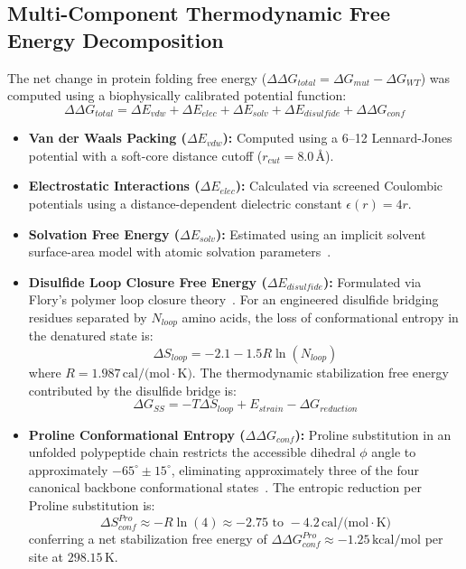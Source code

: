 \documentclass[10pt,twocolumn,a4paper]{article}
\begin{document}
\subsection{Multi-Component Thermodynamic Free Energy Decomposition}
The net change in protein folding free energy ($\Delta\Delta G_{total} = \Delta G_{mut} - \Delta G_{WT}$) was computed using a biophysically calibrated potential function:
\begin{equation}
\Delta\Delta G_{total} = \Delta E_{vdw} + \Delta E_{elec} + \Delta E_{solv} + \Delta E_{disulfide} + \Delta\Delta G_{conf}
\label{eq:ddg_decomp}
\end{equation}
\begin{itemize}
    \item \textbf{Van der Waals Packing ($\Delta E_{vdw}$):} Computed using a 6–12 Lennard-Jones potential with a soft-core distance cutoff ($r_{cut} = 8.0\,\text{\AA}$).
    \item \textbf{Electrostatic Interactions ($\Delta E_{elec}$):} Calculated via screened Coulombic potentials using a distance-dependent dielectric constant $\epsilon(r) = 4r$.
    \item \textbf{Solvation Free Energy ($\Delta E_{solv}$):} Estimated using an implicit solvent surface-area model with atomic solvation parameters~\cite{Eisenberg1986}.
    \item \textbf{Disulfide Loop Closure Free Energy ($\Delta E_{disulfide}$):} Formulated via Flory's polymer loop closure theory~\cite{Flory1956,Pace1988}. For an engineered disulfide bridging residues separated by $N_{loop}$ amino acids, the loss of conformational entropy in the denatured state is:
    \begin{equation}
    \Delta S_{loop} = -2.1 - 1.5 R \ln(N_{loop})
    \label{eq:flory}
    \end{equation}
    where $R = 1.987\,\text{cal/(mol}\cdot\text{K)}$. The thermodynamic stabilization free energy contributed by the disulfide bridge is:
    \begin{equation}
    \Delta G_{SS} = -T \Delta S_{loop} + E_{strain} - \Delta G_{reduction}
    \end{equation}
    \item \textbf{Proline Conformational Entropy ($\Delta\Delta G_{conf}$):} Proline substitution in an unfolded polypeptide chain restricts the accessible dihedral $\phi$ angle to approximately $-65^\circ \pm 15^\circ$, eliminating approximately three of the four canonical backbone conformational states~\cite{Matthews1987}. The entropic reduction per Proline substitution is:
    \begin{equation}
    \Delta S_{conf}^{Pro} \approx -R \ln(4) \approx -2.75\text{ to }-4.2\,\text{cal/(mol}\cdot\text{K)}
    \label{eq:pro_entropy}
    \end{equation}
    conferring a net stabilization free energy of $\Delta\Delta G_{conf}^{Pro} \approx -1.25\,\text{kcal/mol}$ per site at $298.15\,\text{K}$.
\end{itemize}
\end{document}
